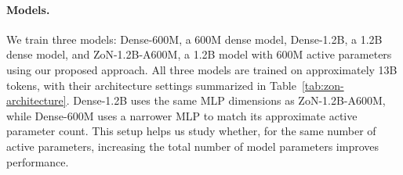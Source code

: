 \begin{table}[!htbp]
\caption{Model architecture and training budgets. Dense-600M uses a narrower MLP; the other architecture settings are shared.}
\label{tab:zon-architecture}
\begin{center}
\small
\setlength{\tabcolsep}{4pt}
\end{center}
\end{table}


\paragraph{Models.}
We train three models: Dense-600M, a 600M dense model, Dense-1.2B, a 1.2B dense model, and
ZoN-1.2B-A600M, a 1.2B model with 600M active parameters using our proposed approach.
All three models are trained on approximately 13B tokens, with their architecture
settings summarized in Table~\ref{tab:zon-architecture}. Dense-1.2B uses the same
MLP dimensions as ZoN-1.2B-A600M, while Dense-600M uses a narrower MLP to match its
approximate active parameter count. This setup helps us study whether, for the same number of
active parameters, increasing the total number of model parameters improves performance.

